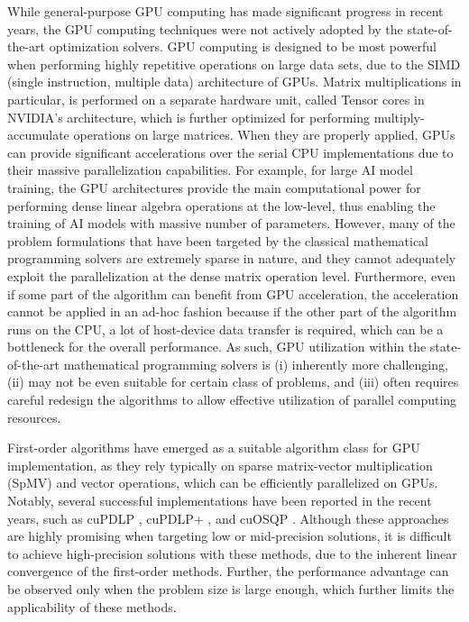\documentclass{article}
\begin{document}
While general-purpose GPU computing has made significant progress in recent years, the GPU computing techniques were not actively adopted by the state-of-the-art optimization solvers.
GPU computing is designed to be most powerful when performing highly repetitive operations on large data sets, due to the SIMD (single instruction, multiple data) architecture of GPUs.
Matrix multiplications in particular, is performed on a separate hardware unit, called Tensor cores in NVIDIA's architecture, which is further optimized for performing multiply-accumulate operations on large matrices.
When they are properly applied, GPUs can provide significant accelerations over the serial CPU implementations due to their massive parallelization capabilities.
For example, for large AI model training, the GPU architectures provide the main computational power for performing dense linear algebra operations at the low-level, thus enabling the training of AI models with massive number of parameters.
However, many of the problem formulations that have been targeted by the classical mathematical programming solvers are extremely sparse in nature, and they cannot adequately exploit the parallelization at the dense matrix operation level.
Furthermore, even if some part of the algorithm can benefit from GPU acceleration, the acceleration cannot be applied in an ad-hoc fashion because if the other part of the algorithm runs on the CPU, a lot of host-device data transfer is required, which can be a bottleneck for the overall performance.
As such, GPU utilization within the state-of-the-art mathematical programming solvers is (i) inherently more challenging, (ii) may not be even suitable for certain class of problems, and (iii) often requires careful redesign the algorithms to allow effective utilization of parallel computing resources.

First-order algorithms have emerged as a suitable algorithm class for GPU implementation, as they rely typically on sparse matrix-vector multiplication (SpMV) and vector operations, which can be efficiently parallelized on GPUs.
Notably, several successful implementations have been reported in the recent years, such as cuPDLP \cite{}, cuPDLP+ \cite{}, and cuOSQP \cite{}.
Although these approaches are highly promising when targeting low or mid-precision solutions, it is difficult to achieve high-precision solutions with these methods, due to the inherent linear convergence of the first-order methods.
Further, the performance advantage can be observed only when the problem size is large enough, which further limits the applicability of these methods.
\end{document}
